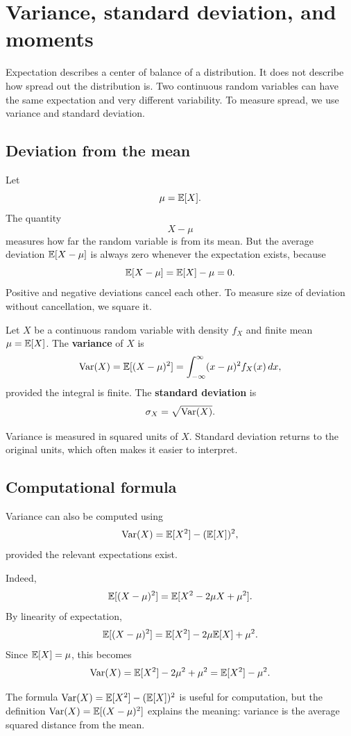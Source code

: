 \section{Variance, standard deviation, and moments}

Expectation describes a center of balance of a distribution. It does not describe
how spread out the distribution is. Two continuous random variables can have the
same expectation and very different variability. To measure spread, we use
variance and standard deviation.

\subsection*{Deviation from the mean}

Let
\[
\mu=\mathbb{E}[X].
\]
The quantity
\[
X-\mu
\]
measures how far the random variable is from its mean. But the average deviation
\(\mathbb{E}[X-\mu]\) is always zero whenever the expectation exists, because
\[
\mathbb{E}[X-\mu]=\mathbb{E}[X]-\mu=0.
\]
Positive and negative deviations cancel each other. To measure size of deviation
without cancellation, we square it.

\begin{definitionbox}
Let \(X\) be a continuous random variable with density \(f_X\) and finite mean
\(\mu=\mathbb{E}[X]\). The \textbf{variance} of \(X\) is
\[
\operatorname{Var}(X)=\mathbb{E}[(X-
\mu)^2]=\int_{-\infty}^{\infty}(x-\mu)^2f_X(x)\,dx,
\]
provided the integral is finite. The \textbf{standard deviation} is
\[
\sigma_X=\sqrt{\operatorname{Var}(X)}.
\]
\end{definitionbox}

Variance is measured in squared units of \(X\). Standard deviation returns to the
original units, which often makes it easier to interpret.

\subsection*{Computational formula}

Variance can also be computed using
\[
\operatorname{Var}(X)=\mathbb{E}[X^2]-(\mathbb{E}[X])^2,
\]
provided the relevant expectations exist.

Indeed,
\[
\mathbb{E}[(X-
\mu)^2]=\mathbb{E}[X^2-2\mu X+
\mu^2].
\]
By linearity of expectation,
\[
\mathbb{E}[(X-
\mu)^2]=\mathbb{E}[X^2]-2\mu\mathbb{E}[X]+
\mu^2.
\]
Since \(\mathbb{E}[X]=\mu\), this becomes
\[
\operatorname{Var}(X)=\mathbb{E}[X^2]-2\mu^2+
\mu^2=\mathbb{E}[X^2]-
\mu^2.
\]

\begin{remarkbox}
The formula \(\operatorname{Var}(X)=\mathbb{E}[X^2]-(\mathbb{E}[X])^2\) is useful for computation, but the
definition \(\operatorname{Var}(X)=\mathbb{E}[(X-
\mu)^2]\) explains the meaning: variance is the
average squared distance from the mean.
\end{remarkbox}

